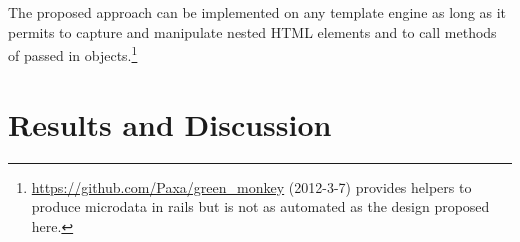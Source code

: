 \documentclass[12pt,a4paper,twoside]{scrartcl}		%
\newcommand{\citeurl}[2]{\url{#1} (#2)}
\begin{document}
The proposed approach can be implemented on any template engine as long as it
permits to capture and manipulate nested HTML elements and to call methods of
passed in
objects.\footnote{\citeurl{https://github.com/Paxa/green_monkey}{2012-3-7}
  provides helpers to produce microdata in rails but is not as automated as the
  design proposed here.}






\section{Results and Discussion}
\label{sec:results-discussion}



\end{document}
